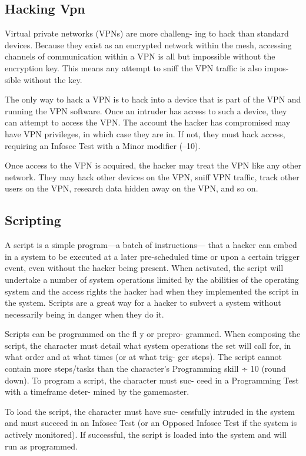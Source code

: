 \subsection{Hacking Vpn}

Virtual private networks (VPNs) are more challeng-
ing to hack than standard devices. Because they exist 
as an encrypted network within the mesh, accessing 
channels of communication within a VPN is all but 
impossible without the encryption key. This means 
any attempt to sniff the VPN traffic is also impos-
sible without the key.

The only way to hack a VPN is to hack into a 
device that is part of the VPN and running the VPN 
software. Once an intruder has access to such a device, 
they can attempt to access the VPN. The account the 
hacker has compromised may have VPN privileges, in 
which case they are in. If not, they must hack access, 
requiring an Infosec Test with a Minor modifier (–10).

Once access to the VPN is acquired, the hacker may 
treat the VPN like any other network. They may hack 
other devices on the VPN, sniff VPN traffic,  track 
other users on the VPN, research data hidden away 
on the VPN, and so on.

\subsection{Scripting}

A script is a simple program—a batch of instructions—
that a hacker can embed in a system to be executed at 
a later pre-scheduled time or upon a certain trigger 
event, even without the hacker being present. When 
activated, the script will undertake a number of system 
operations limited by the abilities of the operating 
system and the access rights the hacker had when 
they implemented the script in the system. Scripts are 
a great way for a hacker to subvert a system without 
necessarily being in danger when they do it.

Scripts can be programmed on the fl y or prepro-
grammed. When composing the script, the character 
must detail what system operations the set will call 
for, in what order and at what times (or at what trig-
ger steps). The script cannot contain more steps/tasks 
than the character's Programming skill ÷ 10 (round 
down). To program a script, the character must suc-
ceed in a Programming Test with a timeframe deter-
mined by the gamemaster.

To load the script, the character must have suc-
cessfully intruded in the system and must succeed 
in an Infosec Test (or an Opposed Infosec Test if the 
system is actively monitored). If successful, the script 
is loaded into the system and will run as programmed.

